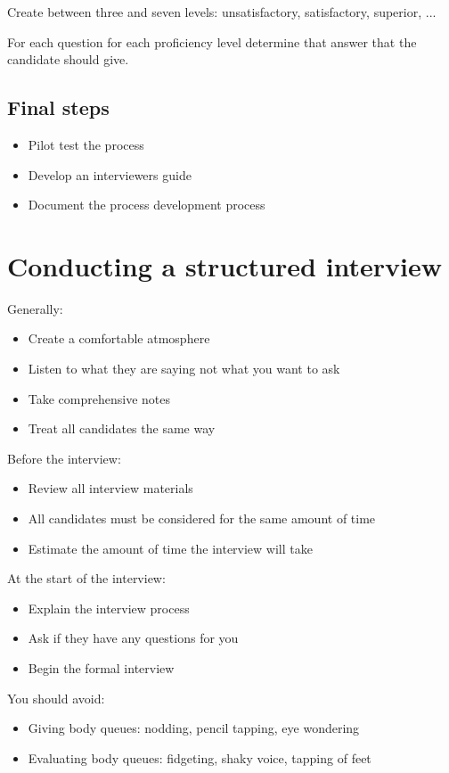 \documentclass{article}
\begin{document}
Create between three and seven levels: unsatisfactory, satisfactory, superior, ...

For each question for each proficiency level determine that answer that the candidate should give.


\subsection{Final steps}

\begin{itemize}
  \item Pilot test the process
  \item Develop an interviewers guide
  \item Document the process development process
\end{itemize}



\section{Conducting a structured interview}

Generally:
\begin{itemize}
  \item Create a comfortable atmosphere
  \item Listen to what they are saying not what you want to ask
  \item Take comprehensive notes
  \item Treat all candidates the same way
\end{itemize}

Before the interview:
\begin{itemize}
  \item Review all interview materials
  \item All candidates must be considered for the same amount of time
  \item Estimate the amount of time the interview will take
\end{itemize}

At the start of the interview:
\begin{itemize}
  \item Explain the interview process
  \item Ask if they have any questions for you
  \item Begin the formal interview
\end{itemize}

You should avoid:
\begin{itemize}
  \item Giving body queues: nodding, pencil tapping, eye wondering
  \item Evaluating body queues: fidgeting, shaky voice, tapping of feet
\end{itemize}
\end{document}
